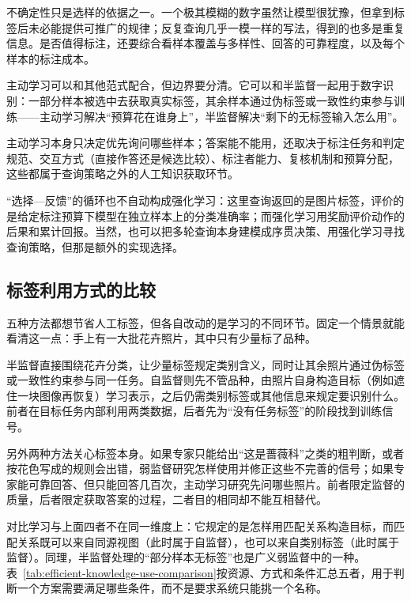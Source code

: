 不确定性只是选样的依据之一。一个极其模糊的数字虽然让模型很犹豫，但拿到标签后未必能提供可推广的规律；反复查询几乎一模一样的写法，得到的也多是重复信息。是否值得标注，还要综合看样本覆盖与多样性、回答的可靠程度，以及每个样本的标注成本。

主动学习可以和其他范式配合，但边界要分清。它可以和半监督一起用于数字识别：一部分样本被选中去获取真实标签，其余样本通过伪标签或一致性约束参与训练——主动学习解决“预算花在谁身上”，半监督解决“剩下的无标签输入怎么用”。

主动学习本身只决定优先询问哪些样本；答案能不能用，还取决于标注任务和判定规范、交互方式（直接作答还是候选比较）、标注者能力、复核机制和预算分配，这些都属于查询策略之外的人工知识获取环节。

“选择—反馈”的循环也不自动构成强化学习：这里查询返回的是图片标签，评价的是给定标注预算下模型在独立样本上的分类准确率；而强化学习用奖励评价动作的后果和累计回报。当然，也可以把多轮查询本身建模成序贯决策、用强化学习寻找查询策略，但那是额外的实现选择。

\subsection{标签利用方式的比较}
\label{sec:efficient-knowledge-use-comparison}

五种方法都想节省人工标签，但各自改动的是学习的不同环节。固定一个情景就能看清这一点：手上有一大批花卉照片，其中只有少量标了品种。

半监督直接围绕花卉分类，让少量标签规定类别含义，同时让其余照片通过伪标签或一致性约束参与同一任务。自监督则先不管品种，由照片自身构造目标（例如遮住一块图像再恢复）学习表示，之后仍需类别标签或其他信息来规定要识别什么。前者在目标任务内部利用两类数据，后者先为“没有任务标签”的阶段找到训练信号。

另外两种方法关心标签本身。如果专家只能给出“这是蔷薇科”之类的粗判断，或者按花色写成的规则会出错，弱监督研究怎样使用并修正这些不完善的信号；如果专家能可靠回答、但只能回答几百次，主动学习研究先问哪些照片。前者限定监督的质量，后者限定获取答案的过程，二者目的相同却不能互相替代。

对比学习与上面四者不在同一维度上：它规定的是怎样用匹配关系构造目标，而匹配关系既可以来自同源视图（此时属于自监督），也可以来自类别标签（此时属于监督）。同理，半监督处理的“部分样本无标签”也是广义弱监督中的一种。表~\ref{tab:efficient-knowledge-use-comparison}按资源、方式和条件汇总五者，用于判断一个方案需要满足哪些条件，而不是要求系统只能挑一个名称。

